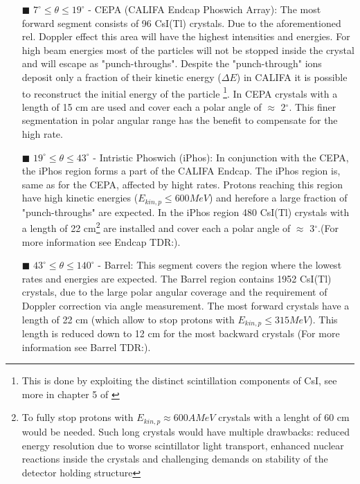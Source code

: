 \begin{enumerate}
\item[$\blacksquare$] $7^{\circ} \leq \theta \leq 19^{\circ}$ - CEPA (CALIFA Endcap Phoswich Array): The most forward segment consists of 96 CsI(Tl) crystals. Due to the aforementioned rel. Doppler effect this area will have the highest intensities and energies. For high beam energies most of the particles will not be stopped inside the crystal and will escape as "punch-throughs". Despite the "punch-through" ions deposit only a fraction of their kinetic energy ($\Delta E$) in CALIFA it is possible to reconstruct the initial energy of the particle \footnote{This is done by exploiting the distinct scintillation components of CsI, see more in chapter 5 of \cite{Bendel:98055}}. In CEPA crystals with a length of 15 cm are used and cover each a polar angle of $\approx$ 2$^{\circ}$. This finer segmentation in polar angular range has the benefit to compensate for the high rate.     
\item[$\blacksquare$] $19^{\circ} \leq \theta \leq 43^{\circ}$ - Intristic Phoswich (iPhos): In conjunction with the CEPA, the iPhos region forms a part of the CALIFA Endcap. The iPhos region is, same as for the CEPA, affected by hight rates. Protons reaching this region have high kinetic energies ($E_{kin,p} \leq 600 MeV$) and herefore a large fraction of "punch-throughs" are expected. In the iPhos region 480 CsI(Tl) crystals with a length of 22 cm\footnote{To fully stop protons with $E_{kin,p} \approx 600 AMeV$ crystals with a lenght of 60 cm would be needed. Such long crystals would have multiple drawbacks: reduced energy resolution due to worse scintillator light transport, enhanced nuclear reactions inside the crystals and challenging demands on stability of the detector holding structure} are installed and cover each a polar angle of $\approx$ 3$^{\circ}$.(For more information see Endcap TDR:\cite{tdr:endcap}).
\item[$\blacksquare$] $43^{\circ} \leq \theta \leq 140^{\circ}$ - Barrel: This segment covers the region where the lowest rates and energies are expected. The Barrel region contains 1952 CsI(Tl) crystals, due to the large polar angular coverage and the requirement of Doppler correction via angle measurement. The most forward crystals have a length of 22 cm (which allow to stop protons with $E_{kin,p} \leq 315 MeV$). This length is reduced down to 12 cm for the most backward crystals (For more information see Barrel TDR:\cite{tdr:barrel}).   
\end{enumerate}
